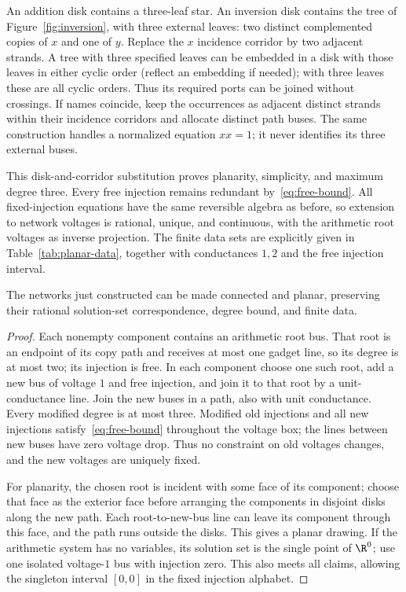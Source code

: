 An addition disk contains a three-leaf star. An inversion disk contains the
tree of Figure~\ref{fig:inversion}, with three external leaves: two distinct
complemented copies of $x$ and one of $y$. Replace the $x$ incidence corridor
by two adjacent strands. A tree with three specified leaves can be embedded
in a disk with those leaves in either cyclic order (reflect an embedding if
needed); with three leaves these are all cyclic orders. Thus its required
ports can be joined without crossings. If names coincide, keep the
occurrences as adjacent distinct strands within their incidence corridors
and allocate distinct path buses. The same construction handles a normalized
equation $xx=1$; it never identifies its three external buses.

This disk-and-corridor substitution proves planarity, simplicity, and maximum
degree three. Every free injection remains redundant by~\eqref{eq:free-bound}.
All fixed-injection equations have the same reversible algebra as before,
so extension to network voltages is rational, unique, and continuous, with
the arithmetic root voltages as inverse projection. The finite data sets
are explicitly given in Table~\ref{tab:planar-data}, together with
conductances $1,2$ and the free injection interval.

\begin{lemma}
\label{lem:connect}
The networks just constructed can be made connected and planar, preserving
their rational solution-set correspondence, degree bound, and finite data.
\end{lemma}
\begin{proof}
Each nonempty component contains an arithmetic root bus. That root is an
endpoint of its copy path and receives at most one gadget line, so its degree
is at most two; its injection is free. In each component choose one such root,
add a new bus of voltage $1$ and free injection, and join it to that root by
a unit-conductance line. Join the new buses in a path, also with unit
conductance. Every modified degree is at most three. Modified old injections
and all new injections satisfy~\eqref{eq:free-bound} throughout the voltage
box; the lines between new buses have zero voltage drop. Thus no constraint
on old voltages changes, and the new voltages are uniquely fixed.

For planarity, the chosen root is incident with some face of its component;
choose that face as the exterior face before arranging the components in
disjoint disks along the new path. Each root-to-new-bus line can leave its
component through this face, and the path runs outside the disks. This gives
a planar drawing. If the arithmetic system has no variables, its solution
set is the single point of $\R^0$; use one isolated voltage-$1$ bus with
injection zero. This also meets all claims, allowing the singleton interval
$[0,0]$ in the fixed injection alphabet.
\end{proof}

